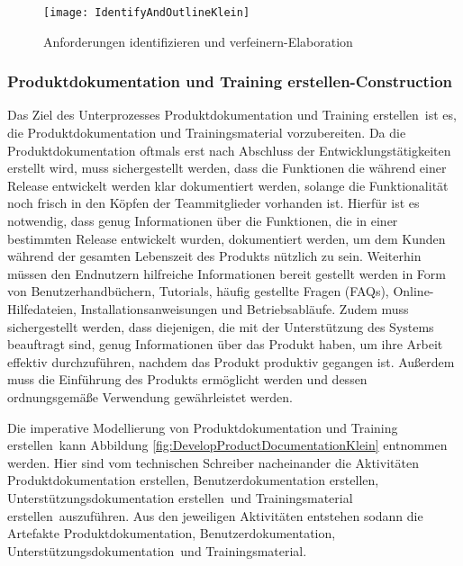 \begin{figure}[[!htbp]
\begin{center}
  \texttt{[image: IdentifyAndOutlineKlein]} %
  \caption{Anforderungen identifizieren und verfeinern-Elaboration}
  \label{fig:IdentifyAndOutlineKlein}
\end{center}
\end{figure}


\subsubsection{Produktdokumentation und Training erstellen-Construction}
 Das Ziel des Unterprozesses \grqq Produktdokumentation und Training erstellen\grqq \ ist es, die Produktdokumentation und Trainingsmaterial vorzubereiten. Da die Produktdokumentation oftmals erst nach Abschluss der Entwicklungstätigkeiten erstellt wird, muss sichergestellt werden, dass die Funktionen die während einer Release entwickelt werden klar dokumentiert werden, solange die Funktionalität noch frisch in den Köpfen der Teammitglieder vorhanden ist.\newline
 Hierfür ist es notwendig, dass genug Informationen über die Funktionen, die in einer bestimmten Release entwickelt wurden, dokumentiert werden, um dem Kunden während der gesamten Lebenszeit des Produkts nützlich zu sein.\newline
 Weiterhin müssen den Endnutzern hilfreiche Informationen bereit gestellt werden in Form von Benutzerhandbüchern, Tutorials, häufig gestellte Fragen (FAQs), Online-Hilfedateien, Installationsanweisungen und Betriebsabläufe. \newline
 Zudem muss sichergestellt werden, dass diejenigen, die mit der Unterstützung des Systems beauftragt sind, genug Informationen über das Produkt haben, um ihre Arbeit effektiv durchzuführen, nachdem das Produkt produktiv gegangen ist. Außerdem muss die Einführung des Produkts ermöglicht werden und dessen ordnungsgemäße Verwendung gewährleistet werden.\newline
 
 Die imperative Modellierung von \grqq Produktdokumentation und Training erstellen\grqq \ kann Abbildung \ref{fig:DevelopProductDocumentationKlein} entnommen werden.\newline
 Hier sind vom technischen Schreiber nacheinander die Aktivitäten \grqq Produktdokumentation erstellen\grqq, \grqq Benutzerdokumentation erstellen\grqq, \grqq Unterstützungsdokumentation erstellen\grqq \ und \grqq Trainingsmaterial erstellen\grqq \ auszuführen. Aus den jeweiligen Aktivitäten entstehen sodann die Artefakte \grqq Produktdokumentation, Benutzerdokumentation, Unterstützungsdokumentation\grqq \ und \grqq Trainingsmaterial\grqq.
 
